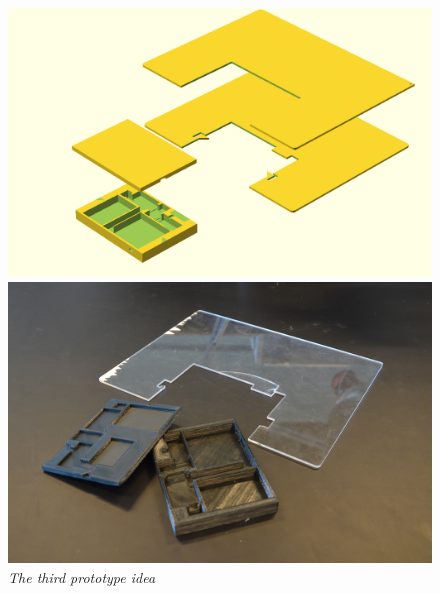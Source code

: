 \begin{figure}[h]
\begin{minipage}[b]{7.5cm}
\centering
\includegraphics[scale=0.235]{figures/iterations/v4.png}
\end{minipage}
\begin{minipage}[b]{7.5cm}
\centering
\includegraphics[scale=0.58]{figures/iterations/v4-photo.jpg}
\end{minipage}
\caption{\small {\it {The third prototype idea}}} \label{fig:v3}
\end{figure}

